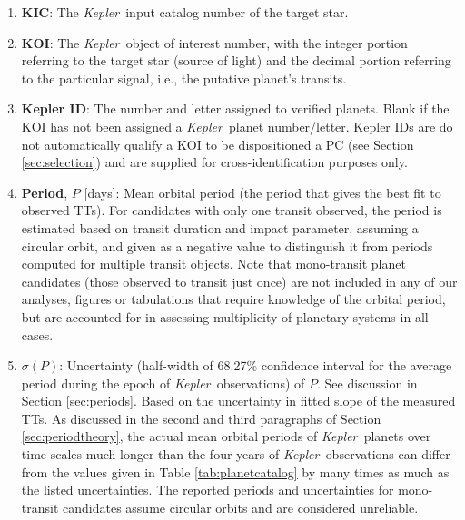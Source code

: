 \documentclass{aastex62}
\newcommand{\ik}{{\it Kepler~}}
\begin{document}
\begin{enumerate}
    \item \textbf{KIC}: The \ik input catalog number of the target star.
    \item \textbf{KOI}: The \ik object of interest number, with the integer portion referring to the target star (source of light) and the decimal portion referring to the particular signal, i.e., the putative planet's transits. 
    \item \textbf{Kepler ID}: The number and letter assigned to verified planets. Blank if the KOI has not been assigned a \ik planet number/letter.  Kepler IDs are do not automatically qualify a KOI to be dispositioned a PC (see Section \ref{sec:selection}) and are supplied for cross-identification purposes only. 
    \item \textbf{Period}, $P$ [days]: Mean orbital period (the period that gives the best fit to observed TTs). For candidates with only one transit observed, the period is estimated based on transit duration and impact parameter, assuming a circular orbit, and given as a negative value to distinguish it from periods computed for multiple transit objects. Note that mono-transit planet candidates (those observed to transit just once) are not included in any of our analyses, figures or tabulations that require knowledge of the orbital period, but are accounted for in assessing multiplicity of planetary systems in all cases.
    \item \textbf{$\sigma(P)$}: Uncertainty (half-width of 68.27\% confidence interval for the average period during the epoch of \ik observations) of $P$.  See discussion in Section \ref{sec:periods}. Based on the uncertainty in fitted slope of the measured TTs. As discussed in the second and third paragraphs of Section \ref{sec:periodtheory}, the actual mean orbital periods of \ik planets over time scales much longer than the four years of \ik observations can differ from the values given in Table \ref{tab:planetcatalog} by many times as much as the listed uncertainties. The reported periods and uncertainties for mono-transit candidates assume circular orbits and are considered unreliable.  

\end{enumerate}
\end{document}
